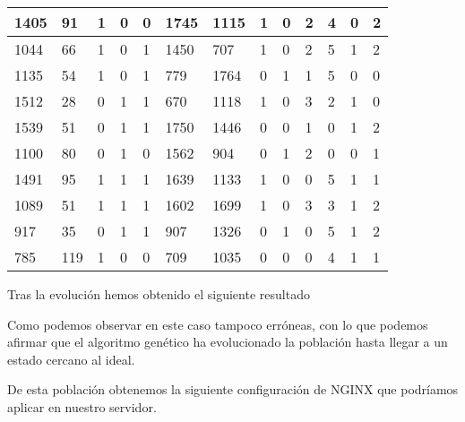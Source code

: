 \begin{table}[H]
\begin{tabular}{|l|l|l|l|l|l|l|l|l|l|l|l|l|}
1405       & 91         & 1          & 0          & 0          & 1745       & 1115       & 1          & 0          & 2           & 4           & 0           & 2           \\ \hline
1044       & 66         & 1          & 0          & 1          & 1450       & 707        & 1          & 0          & 2           & {\color[HTML]{FE0000}5}           & 1           & 2           \\ \hline
1135       & 54         & 1          & 0          & 1          & 779        & 1764       & 0          & 1          & 1           & {\color[HTML]{FE0000}5}           & 0           & 0           \\ \hline
1512       & 28         & 0          & 1          & 1          & 670        & 1118       & 1          & 0          & {\color[HTML]{FE0000}3}           & 2           & 1           & 0           \\ \hline
1539       & 51         & 0          & 1          & 1          & 1750       & 1446       & 0          & 0          & 1           & 0           & 1           & 2           \\ \hline
1100       & 80         & 0          & 1          & 0          & 1562       & 904        & 0          & 1          & 2           & 0           & 0           & 1           \\ \hline
1491       & 95         & 1          & 1          & 1          & 1639       & 1133       & 1          & 0          & 0           & {\color[HTML]{FE0000}5}           & 1           & 1           \\ \hline
1089       & 51         & 1          & 1          & 1          & 1602       & 1699       & 1          & 0          & {\color[HTML]{FE0000}3}           & 3           & 1           & 2           \\ \hline
917        & 35         & 0          & 1          & 1          & 907        & 1326       & 0          & 1          & 0           & {\color[HTML]{FE0000}5}           & 1           & 2           \\ \hline
785        & 119        & 1          & 0          & 0          & 709        & 1035       & 0          & 0          & 0           & 4           & 1           & 1           \\ \hline
\end{tabular}
\end{table}

Tras la evolución hemos obtenido el siguiente resultado



Como podemos observar en este caso tampoco erróneas, con lo que podemos afirmar que el algoritmo genético ha evolucionado la población hasta llegar a un estado cercano al ideal.

\bigskip
De esta población obtenemos la siguiente configuración de NGINX que podríamos aplicar en nuestro servidor.

\begin{lstlisting}[label={lst:nginx_config_random},caption={Configuración de NGINX tras 30 generaciones}]

\end{lstlisting}

